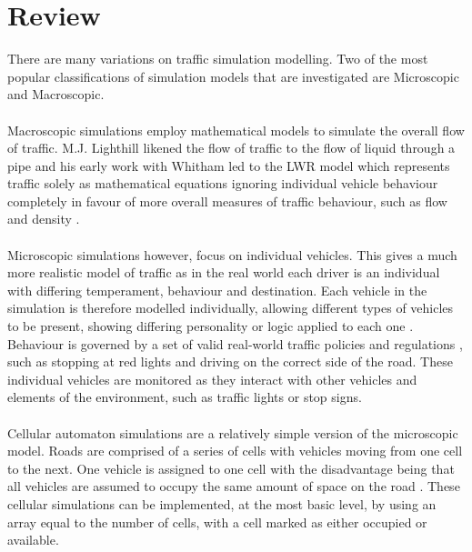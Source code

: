 \section{Review}
There are many variations on traffic simulation modelling. Two of the most popular classifications of simulation models that are investigated are Microscopic and Macroscopic.

\paragraph{}
Macroscopic simulations employ mathematical models to simulate the overall flow of traffic. M.J. Lighthill likened the flow of traffic to the flow of liquid through a pipe and his early work with Whitham led to the LWR model which represents traffic solely as mathematical equations \cite{Lighthill1955Kinetic,Treiber2013Flow,6042479} ignoring individual vehicle behaviour completely in favour of more overall measures of traffic behaviour, such as flow and density \cite{boxill2000evaluation,ehlert2001reactive}. 

\paragraph{}
Microscopic simulations however, focus on individual vehicles. This gives a much more realistic model of traffic as in the real world each driver is an individual with differing temperament, behaviour and destination. Each vehicle in the simulation is therefore modelled individually, allowing different types of vehicles to be present, showing differing personality or logic applied to each one \cite{Owen:2000:STS:510378.510542}. Behaviour is governed by a set of valid real-world traffic policies and regulations \cite{Schulze:1997:UTS:268437.268764}, such as stopping at red lights and driving on the correct side of the road.
These individual vehicles are monitored as they interact with other vehicles and elements of the environment, such as traffic lights or stop signs.

\paragraph{}
Cellular automaton simulations are a relatively simple version of the microscopic model. Roads are comprised of a series of cells with vehicles moving from one cell to the next. One vehicle is assigned to one cell with the disadvantage being that all vehicles are assumed to occupy the same amount of space on the road \cite{Namekawa2005CellAutomaton,6737859}. These cellular simulations can be implemented, at the most basic level, by using an array equal to the number of cells, with a cell marked as either occupied or available.

